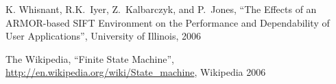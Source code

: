 K. Whisnant, R.K.~Iyer, Z.~Kalbarczyk, and P.~Jones, 
``The Effects of an ARMOR-based SIFT Environment on the Performance and Dependability of User Applications'',   University of Illinois, 2006



The Wikipedia, ``Finite State Machine'', \hyperref{http://en.wikipedia.org/wiki/State\_machine}{}{}{http://en.wikipedia.org/wiki/State\_machine}, Wikipedia 2006




  





